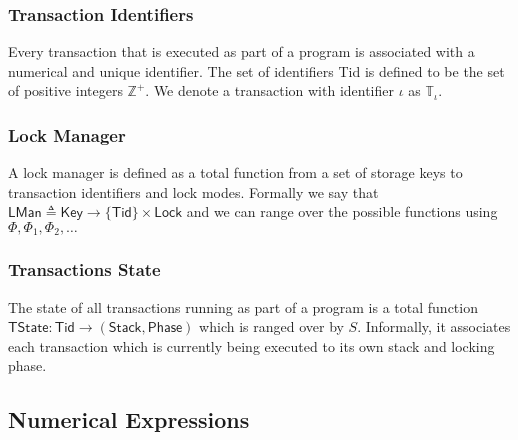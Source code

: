 \subsubsection{Transaction Identifiers}

Every transaction that is executed as part of a program is associated with a numerical and unique identifier. The set of identifiers \textsf{Tid} is defined to be the set of positive integers $\mathds{Z}^+$. We denote a transaction with identifier $\iota$ as $\mathds{T}_\iota$.

\subsubsection{Lock Manager}

A lock manager is defined as a total function from a set of storage keys to transaction identifiers and lock modes. Formally we say that $\mathsf{LMan} \triangleq \mathsf{Key} \rightarrow \{ \mathsf{Tid} \} \times \mathsf{Lock}$ and we can range over the possible functions using $\Phi, \Phi_1, \Phi_2, \ldots$

\subsubsection{Transactions State}

The state of all transactions running as part of a program is a total function $\mathsf{TState} : \mathsf{Tid} \rightarrow (\mathsf{Stack}, \mathsf{Phase})$ which is ranged over by $S$. Informally, it associates each transaction which is currently being executed to its own stack and locking phase.

\subsection{Numerical Expressions}

